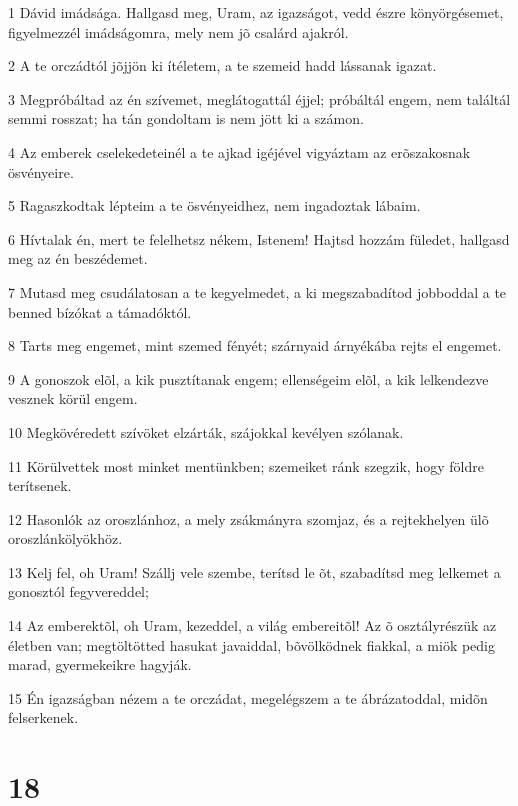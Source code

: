 \par 1 Dávid imádsága. Hallgasd meg, Uram, az igazságot, vedd észre könyörgésemet, figyelmezzél imádságomra, mely nem jõ csalárd ajakról.
\par 2 A te orczádtól jõjjön ki ítéletem, a te szemeid hadd lássanak igazat.
\par 3 Megpróbáltad az én szívemet, meglátogattál éjjel; próbáltál engem, nem találtál semmi rosszat; ha tán gondoltam is nem jött ki a számon.
\par 4 Az emberek cselekedeteinél a te ajkad igéjével vigyáztam az erõszakosnak ösvényeire.
\par 5 Ragaszkodtak lépteim a te ösvényeidhez, nem ingadoztak lábaim.
\par 6 Hívtalak én, mert te felelhetsz nékem, Istenem! Hajtsd hozzám füledet, hallgasd meg az én beszédemet.
\par 7 Mutasd meg csudálatosan a te kegyelmedet, a ki megszabadítod jobboddal a te benned bízókat a támadóktól.
\par 8 Tarts meg engemet, mint szemed fényét; szárnyaid árnyékába rejts el engemet.
\par 9 A gonoszok elõl, a kik pusztítanak engem; ellenségeim elõl, a kik lelkendezve vesznek körül engem.
\par 10 Megkövéredett szívöket elzárták, szájokkal kevélyen szólanak.
\par 11 Körülvettek most minket mentünkben; szemeiket ránk szegzik, hogy földre terítsenek.
\par 12 Hasonlók az oroszlánhoz, a mely zsákmányra szomjaz, és a rejtekhelyen ülõ oroszlánkölyökhöz.
\par 13 Kelj fel, oh Uram! Szállj vele szembe, terítsd le õt, szabadítsd meg lelkemet a gonosztól fegyvereddel;
\par 14 Az emberektõl, oh Uram, kezeddel, a világ embereitõl! Az õ osztályrészük az életben van; megtöltötted hasukat javaiddal, bõvölködnek fiakkal, a miök pedig marad, gyermekeikre hagyják.
\par 15 Én igazságban nézem a te orczádat, megelégszem a te ábrázatoddal, midõn felserkenek.

\chapter{18}

